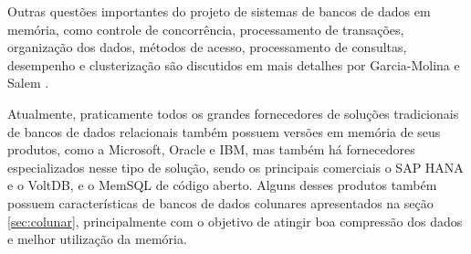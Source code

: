 Outras questões importantes do projeto de sistemas de bancos de dados em memória, como controle de concorrência, processamento de transações, organização dos dados, métodos de acesso, processamento de consultas, desempenho e clusterização são discutidos em mais detalhes por Garcia-Molina e Salem \citep{garcia1992main}.

Atualmente, praticamente todos os grandes fornecedores de soluções tradicionais de bancos de dados 
relacionais também possuem versões em memória de seus produtos, como a Microsoft, Oracle e IBM, mas 
também há fornecedores especializados nesse tipo de solução, sendo os principais comerciais o SAP HANA
e o VoltDB, e o MemSQL de código aberto. Alguns desses produtos também possuem 
características de bancos de dados colunares apresentados na seção \ref{sec:colunar}, principalmente com o objetivo 
de atingir boa compressão dos dados e melhor utilização da memória.





